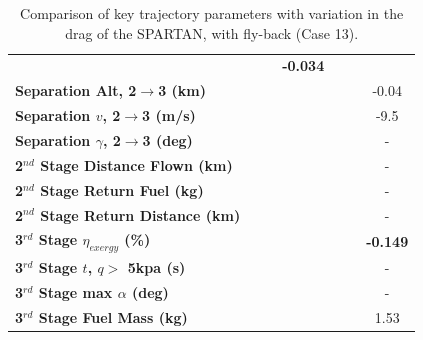 \begin{table}[ht]
\begin{tabular}{l c c c c c c}
		& \textbf{\secondExergyEffCdOneHundredFive}
		& \textbf{\secondExergyEffCdOneHundredTen}
		& \textbf{-0.034}
		\\
		\textbf{Separation Alt, 2$\rightarrow$3 (km)}
		& \secondthirdSeparationAltCdNinety
		& \secondthirdSeparationAltCdNinetyFive
		& \secondthirdSeparationAltCdStandard
		& \secondthirdSeparationAltCdOneHundredFive
		& \secondthirdSeparationAltCdOneHundredTen
		&-0.04
		\\
		\textbf{Separation $v$, 2$\rightarrow$3 (m/s)}
		& \secondthirdSeparationvCdNinety
		& \secondthirdSeparationvCdNinetyFive
		& \secondthirdSeparationvCdStandard
		& \secondthirdSeparationvCdOneHundredFive
		& \secondthirdSeparationvCdOneHundredTen
		&-9.5
		\\
		\textbf{Separation $\gamma$, 2$\rightarrow$3 (deg)}
		& \secondthirdSeparationgammaCdNinety
		& \secondthirdSeparationgammaCdNinetyFive
		& \secondthirdSeparationgammaCdStandard
		& \secondthirdSeparationgammaCdOneHundredFive
		& \secondthirdSeparationgammaCdOneHundredTen
		& -
		\\
	
		\textbf{2$^{nd}$ Stage Distance Flown (km)}
		& \SecondDistCdNinety
		& \SecondDistCdNinetyFive
		& \SecondDistCdStandard
		& \SecondDistCdOneHundredFive
		& \SecondDistCdOneHundredTen
		& -
		\\
		\textbf{2$^{nd}$ Stage Return Fuel (kg)}
		& \returnFuelCdNinety
		& \returnFuelCdNinetyFive
		& \returnFuelCdStandard
		& \returnFuelCdOneHundredFive
		& \returnFuelCdOneHundredTen
		& -
		\\
		\textbf{2$^{nd}$ Stage Return Distance (km)}
		& \returnDistCdNinety
		& \returnDistCdNinetyFive
		& \returnDistCdStandard
		& \returnDistCdOneHundredFive
		& \returnDistCdOneHundredTen
		& -
		\\
		\hline 
		\textbf{3$^{rd}$ Stage $\eta_{exergy}$ (\%)}
		& \textbf{\thirddExergyEffCdNinety}
		& \textbf{\thirddExergyEffCdNinetyFive}
		& \textbf{\thirddExergyEffCdStandard}
		& \textbf{\thirddExergyEffCdOneHundredFive}
		& \textbf{\thirddExergyEffCdOneHundredTen}
		& \textbf{-0.149}
		\\
		\textbf{3$^{rd}$ Stage $t$, $q >$ 5kpa (s)}
		& \thirdqOverFiveCdNinety
		& \thirdqOverFiveCdNinetyFive
		& \thirdqOverFiveCdStandard
		& \thirdqOverFiveCdOneHundredFive
		& \thirdqOverFiveCdOneHundredTen
		& -
		\\
		\textbf{3$^{rd}$ Stage max $\alpha$ (deg)}
		& \thirdmaxAoACdNinety
		& \thirdmaxAoACdNinetyFive
		& \thirdmaxAoACdStandard
		& \thirdmaxAoACdOneHundredFive
		& \thirdmaxAoACdOneHundredTen
		& -
		\\
		\textbf{3$^{rd}$ Stage Fuel Mass (kg)}
		& \thirdmFuelCdNinety
		& \thirdmFuelCdNinetyFive
		& \thirdmFuelCdStandard
		& \thirdmFuelCdOneHundredFive
		& \thirdmFuelCdOneHundredTen
		&1.53
		\\
		\hline 
	\end{tabular} 
	\caption{Comparison of key trajectory parameters with variation in the drag of the SPARTAN, with fly-back (Case 13).}
	\label{tab:comparison41}
\end{table}


